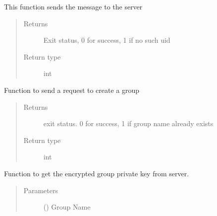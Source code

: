 \documentclass[letterpaper,10pt,english]{sphinxmanual}
\begin{document}
\begin{fulllineitems}
\begin{fulllineitems}
\end{fulllineitems}


\begin{fulllineitems}
\label{\detokenize{Message:Message.Message._sendmsg}}
This function sends the message to the server
\begin{quote}\begin{description}
\item[{Returns}] \leavevmode
Exit status, 0 for success, 1 if no such uid

\item[{Return type}] \leavevmode
int

\end{description}\end{quote}

\end{fulllineitems}


\begin{fulllineitems}
\label{\detokenize{Message:Message.Message._create_grp}}
Function to send a request to create a group
\begin{quote}\begin{description}
\item[{Returns}] \leavevmode
exit status. 0 for success, 1 if group name already exists

\item[{Return type}] \leavevmode
int

\end{description}\end{quote}

\end{fulllineitems}


\begin{fulllineitems}
\label{\detokenize{Message:Message.Message._get_group_key}}
Function to get the encrypted group private key from server.
\begin{quote}\begin{description}
\item[{Parameters}] \leavevmode
{} () \textendash{} Group Name


\end{description}
\end{quote}
\end{fulllineitems}
\end{fulllineitems}
\end{document}
